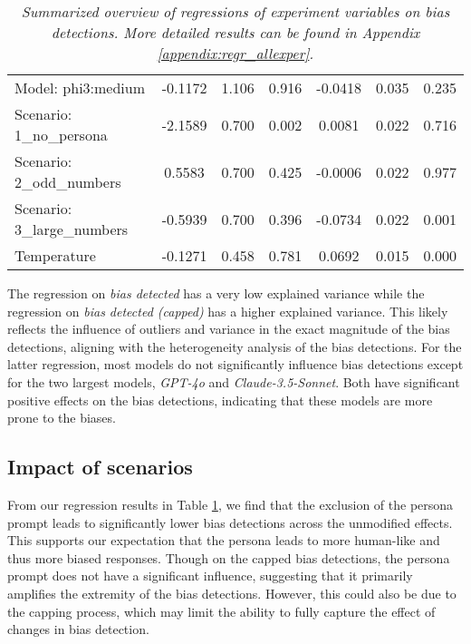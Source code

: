 \begin{table}[h!]
{\begin{tabular}{lccc|ccc}
        Model: phi3:medium & -0.1172 & 1.106 & 0.916 & -0.0418 & 0.035 & 0.235 \\
        Scenario: 1\_no\_persona & -2.1589 & 0.700 & 0.002 & 0.0081 & 0.022 & 0.716 \\
        Scenario: 2\_odd\_numbers & 0.5583 & 0.700 & 0.425 & -0.0006 & 0.022 & 0.977 \\
        Scenario: 3\_large\_numbers & -0.5939 & 0.700 & 0.396 & -0.0734 & 0.022 & 0.001 \\
        Temperature & -0.1271 & 0.458 & 0.781 & 0.0692 & 0.015 & 0.000 \\
        \bottomrule
    \end{tabular}
    }
    \caption[Summary of regressions of experiment variables on bias detections]{\centering  \textit{Summarized overview of regressions of experiment variables on bias detections. More detailed results can be found in Appendix \ref{appendix:regr_allexper}.}}
    \label{tab:summary_regr_allexper}
\end{table}


\par The regression on \textit{bias detected} has a very low explained variance while the regression on \textit{bias detected (capped)} has a higher explained variance. This likely reflects the influence of outliers and variance in the exact magnitude of the bias detections, aligning with the heterogeneity analysis of the bias detections. For the latter regression, most models do not significantly influence bias detections except for the two largest models, \textit{GPT-4o} and \textit{Claude-3.5-Sonnet}. Both have significant positive effects on the bias detections, indicating that these models are more prone to the biases.


\subsection{Impact of scenarios}
\label{results:scenarioimpact}
\par From our regression results in Table \ref{tab:summary_regr_allexper}, we find that the exclusion of the persona prompt leads to significantly lower bias detections across the unmodified effects. This supports our expectation that the persona leads to more human-like and thus more biased responses. Though on the capped bias detections, the persona prompt does not have a significant influence, suggesting that it primarily amplifies the extremity of the bias detections. However, this could also be due to the capping process, which may limit the ability to fully capture the effect of changes in bias detection.

